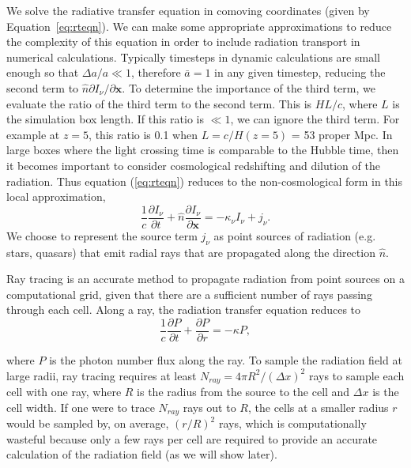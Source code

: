 We solve the radiative transfer equation in comoving coordinates (given by Equation~\ref{eq:rteqn}).
We can make some appropriate approximations to reduce the complexity
of this equation in order to include radiation transport
in numerical calculations.  Typically timesteps in dynamic
calculations are small enough so that $\Delta a/a \ll 1$, therefore
$\bar{a} = 1$ in any given timestep, reducing the second term to
$\hat{n} \partial I_\nu/\partial \mathbf{x}$.  To determine the
importance of the third term, we evaluate the ratio of the third term
to the second term.  This is $HL/c$, where $L$ is the simulation box
length.  If this ratio is $\ll 1$, we can ignore the third term.  For
example at $z=5$, this ratio is 0.1 when $L = c/H(z=5)$ = 53 proper
Mpc.  In large boxes where the light crossing time is comparable to
the Hubble time, then it becomes important to consider cosmological
redshifting and dilution of the radiation.  Thus equation
(\ref{eq:rteqn}) reduces to the non-cosmological form in this local
approximation,
%
\begin{equation}
  \frac{1}{c} \frac{\partial I_\nu}{\partial t} + 
  \hat{n} \frac{\partial I_\nu}{\partial \mathbf{x}} =
  -\kappa_\nu I_\nu + j_\nu .
\end{equation}
%
We choose to represent the source term $j_\nu$ as point sources of
radiation (e.g. stars, quasars) that emit radial rays that are
propagated along the direction $\hat{n}$.

Ray tracing is an accurate method to propagate radiation from point
sources on a computational grid, given that there are a sufficient
number of rays passing through each cell.  Along a ray, the radiation
transfer equation reduces to
%
\begin{equation}
\label{eqn:rtray}
\frac{1}{c} \frac{\partial P}{\partial t} + \frac{\partial P}{\partial
  r} = -\kappa P,
\end{equation}

where $P$ is the photon number flux along the ray.  To sample the
radiation field at large radii, ray tracing requires at least $N_{ray}
= 4\pi R^2 / (\Delta x)^2$ rays to sample each cell with one ray,
where $R$ is the radius from the source to the cell and $\Delta x$ is
the cell width.  If one were to trace $N_{ray}$ rays out to $R$, the
cells at a smaller radius $r$ would be sampled by, on average,
$(r/R)^2$ rays, which is computationally wasteful because only a few
rays per cell  are required to provide an accurate calculation
of the radiation field (as we will show later).

